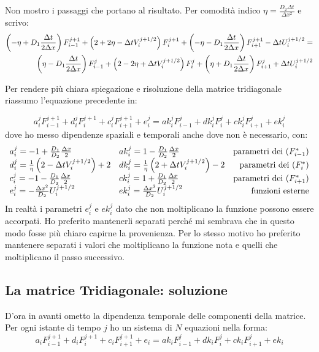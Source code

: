 Non mostro i passaggi che portano al risultato. Per comodit\`a indico $\eta = \frac {D_2 \Delta t}{\Delta x^2}$ e scrivo:
\begin{equation}
  \begin{aligned}
    \left( -\eta+D_1\frac{\Delta t}{2\Delta x} \right)F_{i-1}^{j+1} + \left( 2 + 2\eta- \Delta t V_i^{j+1/2} \right) F^{j+1}_i + \left( -\eta-D_1\frac{\Delta t}{2\Delta x} \right)F_{i+1}^{j+1} - \Delta t U_i^{j+1/2} = \\
    \left( \eta-D_1\frac{\Delta t}{2\Delta x} \right)F_{i-1}^{j} + \left( 2-2\eta+\Delta t V_i^{j+1/2} \right) F^{j}_i + \left( \eta +D_1\frac{\Delta t}{2\Delta x} \right)F_{i+1}^{j} + \Delta t U_i^{j+1/2}
  \end{aligned}
\end{equation}

Per rendere pi\`u chiara spiegazione e risoluzione della matrice tridiagonale riassumo l'equazione precedente in:

\begin{equation}
  a_i^j F_{i-1}^{j+1} + d_i^j F^{j+1}_i + c_i^j F_{i+1}^{j+1} + e_i^j = 
  ak_i^j F_{i-1}^{j} + dk_i^j F^{j}_i + ck_i^j F_{i+1}^{j} + ek_i^j
\end{equation}
dove ho messo dipendenze spaziali e temporali anche dove non \`e necessario, con:
\begin{equation}\label{eq:pararametri}
  \begin{array}{ll r}
    a_i^j = -1+\frac{D_1}{D_2}\frac{\Delta x}2			& ak_i^j =1-\frac{D_1}{D_2}\frac{\Delta x}2			& \text{parametri dei }(F^*_{i-1})\\
    d_i^j = \frac1\eta\left( 2-\Delta t V_i^{j+1/2} \right) +2	& dk_i^j = \frac1\eta\left( 2+\Delta tV_i^{j+1/2} \right) -2	& \text{parametri dei }(F^*_{i})\\
    c_i^j = -1-\frac{D_1}{D_2}\frac{\Delta x}2			& ck_i^j =1+\frac{D_1}{D_2}\frac{\Delta x}2			& \text{parametri dei }(F^*_{i+1})\\
    e_i^j = -\frac{\Delta x^2}{D_2} U_i^{j+1/2}			& ek_i^j =\frac{\Delta x^2}{D_2} U_i^{j+1/2}		& \text{funzioni esterne}
  \end{array}
\end{equation}
In realt\`a i parametri $e_i^j$ e $ek_i^j$ dato che non moltiplicano la funzione possono essere accorpati. Ho preferito mantenerli separati perch\'e mi sembrava che in questo modo fosse pi\`u chiaro capirne la provenienza. Per lo stesso motivo ho preferito mantenere separati i valori che moltiplicano la funzione nota e quelli che moltiplicano il passo successivo.


\subsection{La matrice Tridiagonale: soluzione}\label{section:soluzionetri}
D'ora in avanti ometto la dipendenza temporale delle componenti della matrice. Per ogni istante di tempo $j$ ho un sistema di $N$ equazioni nella forma:
\begin{equation}
  a_{i} F_{i-1}^{j+1}+d_i F_{i}^{j+1} +c_{i}F_{i+1}^{j+1}  + e_i= 
  ak_i F_{i-1}^{j}+ dk_i F_{i}^{j} + ck_i F_{i+1}^{j} + ek_i
\end{equation}

